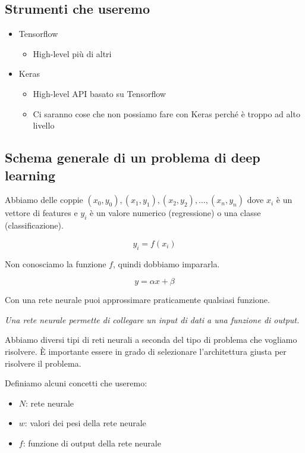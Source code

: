 \subsection{Strumenti che useremo}
\begin{itemize}
  \item Tensorflow
    \begin{itemize}
      \item High-level più di altri
    \end{itemize}
  \item Keras
    \begin{itemize}
      \item High-level API basato su Tensorflow
      \item Ci saranno cose che non possiamo fare con Keras perché è troppo ad alto livello
    \end{itemize}
\end{itemize}

\subsection{Schema generale di un problema di deep learning}

Abbiamo delle coppie $(x_0,y_0), (x_1,y_1), (x_2,y_2), \ldots, (x_n, y_n)$ dove $x_i$ è un vettore di features e $y_i$ è un valore numerico (regressione) o una classe (classificazione).

$$y_i = f(x_i)$$

Non conosciamo la funzione $f$, quindi dobbiamo impararla.

$$y = \alpha x + \beta$$

Con una rete neurale puoi approssimare praticamente qualsiasi funzione.

\textit{Una rete neurale permette di collegare un input di dati a una funzione di output.}

Abbiamo diversi tipi di reti neurali a seconda del tipo di problema che vogliamo risolvere. È importante essere in grado di selezionare l'architettura giusta per risolvere il problema.

Definiamo alcuni concetti che useremo:
\begin{itemize}
  \item $N$: rete neurale
  \item $w$: valori dei pesi della rete neurale
  \item $f$: funzione di output della rete neurale
\end{itemize}


